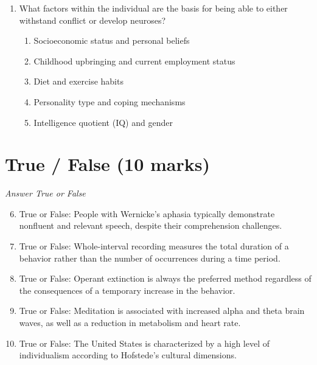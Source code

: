 \documentclass[12pt]{article}
\begin{document}
\begin{enumerate}[label=\arabic*.]
\begin{enumerate}[label=(\alph*)]
    \item solely by their physical needs
    \item striving for self-actualization and personal growth
    \item primary (physical) and secondary (emotional) needs
    \item a constant state of dissatisfaction
    \item desire for power and dominance over others
\end{enumerate}
\item What factors within the individual are the basis for being able to either withstand conflict or develop neuroses?
\begin{enumerate}[label=(\alph*)]
    \item Socioeconomic status and personal beliefs
    \item Childhood upbringing and current employment status
    \item Diet and exercise habits
    \item Personality type and coping mechanisms
    \item Intelligence quotient (IQ) and gender
\end{enumerate}
\end{enumerate}

\section*{True / False (10 marks)}
\textit{Answer True or False}
\begin{enumerate}[label=\arabic*.]
\setcounter{enumi}{5}
\item True or False: People with Wernicke's aphasia typically demonstrate nonfluent and relevant speech, despite their comprehension challenges.
\item True or False: Whole-interval recording measures the total duration of a behavior rather than the number of occurrences during a time period.
\item True or False: Operant extinction is always the preferred method regardless of the consequences of a temporary increase in the behavior.
\item True or False: Meditation is associated with increased alpha and theta brain waves, as well as a reduction in metabolism and heart rate.
\item True or False: The United States is characterized by a high level of individualism according to Hofstede's cultural dimensions.
\end{enumerate}
\end{document}
